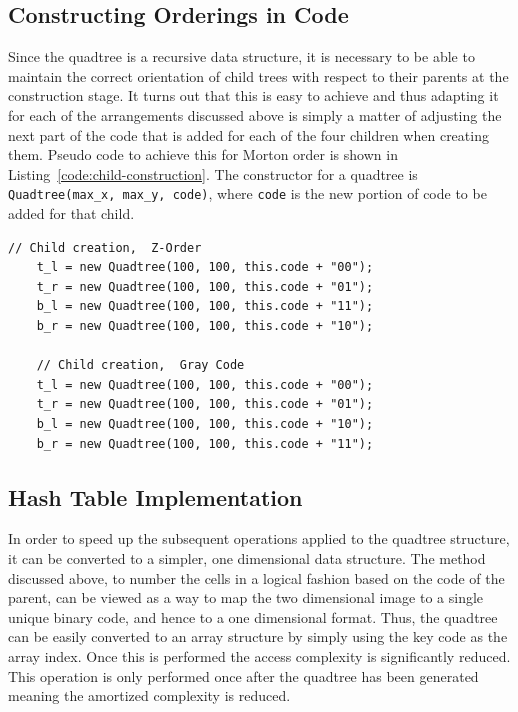 \subsection{Constructing Orderings in Code}
\label{sub:constructing_orderings_in_code}

Since the quadtree is a recursive data structure, it is necessary to be able to
maintain the correct orientation of child trees with respect to their parents
at the construction stage. It turns out that this is easy to achieve and thus
adapting it for each of the arrangements discussed above is simply a matter of
adjusting the next part of the code that is added for each of the four children
when creating them. Pseudo code to achieve this for Morton order is shown in
Listing~\ref{code:child-construction}. The constructor for a quadtree is
\texttt{Quadtree(max\_x, max\_y, code)}, where \texttt{code} is the new portion
of code to be added for that child.

\begin{center}
\begin{minipage}{\textwidth}
\begin{lstlisting}[caption={[Code to generate the children of the current
	quadtree using Z- and Gray ordering.]Code to generate children of the
	current quadtree while maintaining the correct ordering. Z- and Gray
	ordering.}, label=code:child-construction]
	// Child creation,  Z-Order
	t_l = new Quadtree(100, 100, this.code + "00");
	t_r = new Quadtree(100, 100, this.code + "01");
	b_l = new Quadtree(100, 100, this.code + "11");
	b_r = new Quadtree(100, 100, this.code + "10");

	// Child creation,  Gray Code
	t_l = new Quadtree(100, 100, this.code + "00");
	t_r = new Quadtree(100, 100, this.code + "01");
	b_l = new Quadtree(100, 100, this.code + "10");
	b_r = new Quadtree(100, 100, this.code + "11");
\end{lstlisting}
\end{minipage}
\end{center}

\subsection{Hash Table Implementation}
\label{sub:hash_table_implementation}

In order to speed up the subsequent operations applied to the quadtree
structure, it can be converted to a simpler, one dimensional data structure.
The method discussed above, to number the cells in a logical fashion based on
the code of the parent, can be viewed as a way to map the two dimensional image
to a single unique binary code, and hence to a one dimensional format. Thus,
the quadtree can be easily converted to an array structure by simply using the
key code as the array index. Once this is performed the access complexity is
significantly reduced. This operation is only performed once after the quadtree
has been generated meaning the amortized complexity is reduced.

